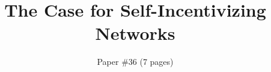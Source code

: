 \documentclass{hotnets15}
\begin{document}
 {}
\date{}


\title{The Case for Self-Incentivizing Networks}

\author{Paper \#36 (7 pages)}

\maketitle









 
\begin{small}

\end{small}
\label{last-page}
\end{document}
